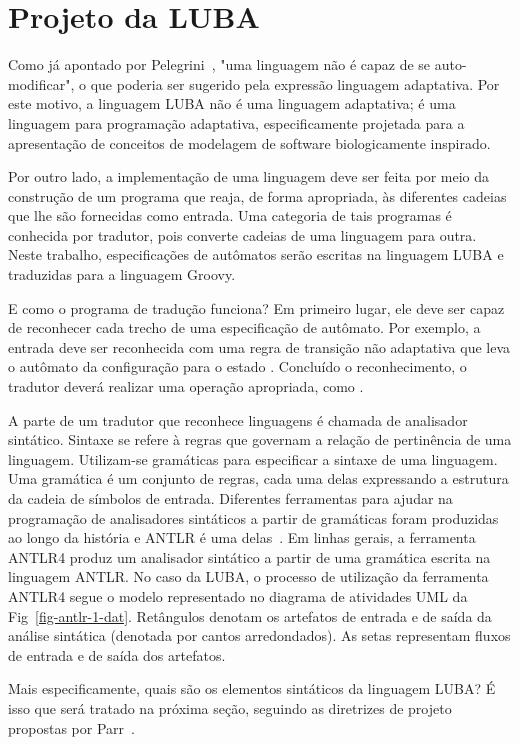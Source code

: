 \section{Projeto da LUBA}
\label{sec:isv:antlr}

Como já apontado por Pelegrini~\cite{pelegrini:2009}, "uma linguagem não é capaz de se auto-modificar", o que poderia ser sugerido pela expressão linguagem adaptativa. Por este motivo, a linguagem LUBA não é uma linguagem adaptativa; é uma linguagem para programação adaptativa, especificamente projetada para a apresentação de conceitos de modelagem de software biologicamente inspirado.

Por outro lado, a implementação de uma linguagem deve ser feita por meio da construção de um programa que reaja, de forma apropriada, às diferentes cadeias que lhe são fornecidas como entrada. Uma categoria de tais programas é conhecida por tradutor, pois converte cadeias de uma linguagem para outra. Neste trabalho, especificações de autômatos serão escritas na linguagem LUBA e traduzidas para a linguagem Groovy.

E como o programa de tradução funciona? Em primeiro lugar, ele deve ser capaz de reconhecer cada trecho de uma especificação de autômato. Por exemplo, a entrada  deve ser reconhecida com uma regra de transição não adaptativa que leva o autômato da configuração  para o estado . Concluído o reconhecimento, o tradutor deverá realizar uma operação apropriada, como .

A parte de um tradutor que reconhece linguagens é chamada de analisador sintático. Sintaxe se refere à regras que governam a relação de pertinência de uma linguagem. Utilizam-se gramáticas para especificar a sintaxe de uma linguagem. Uma gramática é um conjunto de regras, cada uma delas expressando a estrutura da cadeia de símbolos de entrada. Diferentes ferramentas para ajudar na programação de analisadores sintáticos a partir de gramáticas foram produzidas ao longo da história e ANTLR é uma delas~\cite{parr:2013}. Em linhas gerais, a ferramenta ANTLR4 produz um analisador sintático a partir de uma gramática escrita na linguagem ANTLR. No caso da LUBA, o processo de utilização da ferramenta ANTLR4 segue o modelo representado no diagrama de atividades UML da Fig~\ref{fig-antlr-1-dat}. Retângulos denotam os artefatos de entrada e de saída da análise sintática (denotada por cantos arredondados). As setas representam fluxos de entrada e de saída dos artefatos.


Mais especificamente, quais são os elementos sintáticos da linguagem LUBA? É isso que será tratado na próxima seção, seguindo as diretrizes de projeto propostas por Parr~\cite{parr:2007}.
